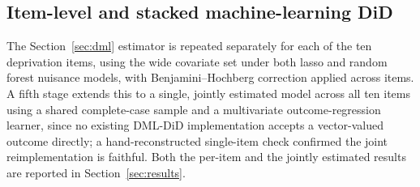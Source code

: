 \subsection{Item-level and stacked machine-learning DiD}
\label{sec:item-dml}
 
The Section~\ref{sec:dml} estimator is repeated separately for each of the ten deprivation items, using the wide covariate set under both lasso and random forest nuisance models, with Benjamini--Hochberg correction applied across items. A fifth stage extends this to a single, jointly estimated model across all ten items using a shared complete-case sample and a multivariate outcome-regression learner, since no existing DML-DiD implementation accepts a vector-valued outcome directly; a hand-reconstructed single-item check confirmed the joint reimplementation is faithful. Both the per-item and the jointly estimated results are reported in Section~\ref{sec:results}.